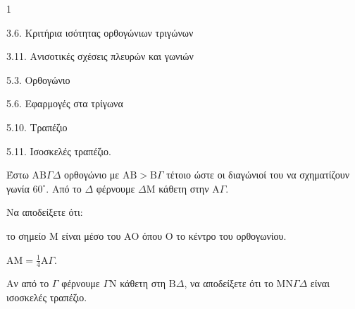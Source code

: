 \begin{ylh}{1}
    \item 3.6. Κριτήρια ισότητας ορθογώνιων τριγώνων
    \item 3.11. Ανισοτικές σχέσεις πλευρών και γωνιών
    \item 5.3. Ορθογώνιο
    \item 5.6. Εφαρμογές στα τρίγωνα
    \item 5.10. Τραπέζιο
    \item 5.11. Ισοσκελές τραπέζιο.
\end{ylh}
Έστω $\mathrm{A}\mathrm{B}\Gamma\Delta$ ορθογώνιο με $\mathrm{A}\mathrm{B} > \mathrm{B}\Gamma$ τέτοιο ώστε οι διαγώνιοί του να σχηματίζουν γωνία $60^\circ$. Από το $\Delta$ φέρνουμε $\Delta\mathrm{M}$ κάθετη στην $\mathrm{A}\Gamma$.
\begin{alist}
    \item Να αποδείξετε ότι:
    \begin{rlist}
        \item το σημείο $\mathrm{M}$ είναι μέσο του $\mathrm{A}\mathrm{O}$ όπου $\mathrm{O}$ το κέντρο του ορθογωνίου. 
        \item $\mathrm{A}\mathrm{M} = \frac{1}{4}\mathrm{A}\Gamma$. 
    \end{rlist}
    \item Αν από το $\Gamma$ φέρνουμε $\Gamma\mathrm{N}$ κάθετη στη $\mathrm{B}\Delta$, να αποδείξετε ότι το $\mathrm{M}\mathrm{N}\Gamma\Delta$ είναι ισοσκελές τραπέζιο. 
\end{alist}
